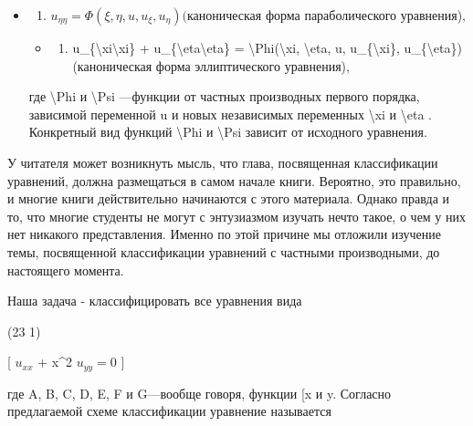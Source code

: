 \documentclass[
]{article}
\providecommand{\tightlist}{%
  \setlength{\itemsep}{0pt}\setlength{\parskip}{0pt}}
\begin{document}
{{\begin{itemize}
\item
  \begin{enumerate}
  \def\labelenumi{\arabic{enumi}.}
  \setcounter{enumi}{1}
  \tightlist
  \item
    \(u_{\eta\eta} = \Phi(\xi, \eta, u, u_{\xi}, u_{\eta}) (\)каноническая
    форма параболического уравнения),
  \end{enumerate}

  \begin{itemize}
  \tightlist
  \item
    \begin{enumerate}
    \def\labelenumi{\arabic{enumi}.}
    \setcounter{enumi}{2}
    \tightlist
    \item
      u\_\{\textbackslash xi\textbackslash xi\} +
      u\_\{\textbackslash eta\textbackslash eta\} =
      \textbackslash Phi(\textbackslash xi, \textbackslash eta, u,
      u\_\{\textbackslash xi\}, u\_\{\textbackslash eta\}) (каноническая
      форма эллиптического уравнения),
    \end{enumerate}
  \end{itemize}

  где \textbackslash Phi и \textbackslash Psi ---функции от частных
  производных первого порядка, зависимой переменной u и новых
  независимых переменных \textbackslash xi и \textbackslash eta .
  Конкретный вид функций \textbackslash Phi и \textbackslash Psi зависит
  от исходного уравнения.
\end{itemize}

У читателя может возникнуть мысль, что глава, посвященная классификации
уравнений, должна размещаться в самом начале книги. Вероятно, это
правильно, и многие книги действительно начинаются с этого материала.
Однако правда и то, что многие студенты не могут с энтузиазмом изучать
нечто такое, о чем у них нет никакого представления. Именно по этой
причине мы отложили изучение темы, посвященной классификации уравнений с
частными производными, до настоящего момента.

Наша задача - классифицировать все уравнения вида

(23 1)

{[} \(u_{xx}\) + x\^{}2 \(u_{yy} = 0\) {]}

где A, B, C, D, E, F и G---вообще говоря, функции {[}x и y. Согласно
предлагаемой схеме классификации уравнение называется

}}
\end{document}
